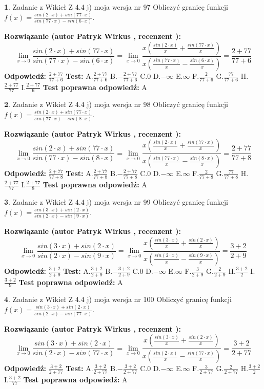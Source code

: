 \documentclass[12pt, a4paper]{article}
\theoremstyle{definition} %
\newtheorem{zad}{}
\newcommand{\zadStart}[1]{\begin{zad}#1\newline}
\newcommand{\zadStop}{\end{zad}}
\newcommand{\rozwStart}[2]{\noindent \textbf{Rozwiązanie (autor #1 , recenzent #2): }\newline}
\newcommand{\rozwStop}{\newline}
\newcommand{\odpStart}{\noindent \textbf{Odpowiedź:}\newline}
\newcommand{\odpStop}{\newline}
\newcommand{\testStart}{\noindent \textbf{Test:}\newline}
\newcommand{\testStop}{\newline}
\newcommand{\kluczStart}{\noindent \textbf{Test poprawna odpowiedź:}\newline}
\newcommand{\kluczStop}{\newline}
\begin{document}
\zadStart{Zadanie z Wikieł Z 4.4 j) moja wersja nr 97}
Obliczyć granicę funkcji $f(x)=\frac{sin(2\cdot x) +sin(77\cdot x)}{sin(77\cdot x) -sin(6\cdot x)}$.
\zadStop
\rozwStart{Patryk Wirkus}{}
$$\lim\limits_{x\to 0}\frac{sin(2\cdot x) +sin(77\cdot x)}{sin(77\cdot x) -sin(6\cdot x)}=\lim\limits_{x\to 0}\frac{x(\frac{sin(2\cdot x)}{x}+\frac{sin(77\cdot x)}{x})}{x(\frac{sin(77\cdot x)}{x}-\frac{sin(6\cdot x)}{x})}=\frac{2+77}{77+6}$$
\rozwStop
\odpStart
$\frac{2+77}{77+6}$
\odpStop
\testStart
A.$\frac{2+77}{77+6}$
B.$-\frac{2+77}{77+6}$
C.$0$
D.$-\infty$
E.$\infty$
F.$\frac{2}{77+6}$
G.$\frac{77}{77+6}$
H.$\frac{2+77}{77}$
I.$\frac{2+77}{6}$
\testStop
\kluczStart
A
\kluczStop



\zadStart{Zadanie z Wikieł Z 4.4 j) moja wersja nr 98}
Obliczyć granicę funkcji $f(x)=\frac{sin(2\cdot x) +sin(77\cdot x)}{sin(77\cdot x) -sin(8\cdot x)}$.
\zadStop
\rozwStart{Patryk Wirkus}{}
$$\lim\limits_{x\to 0}\frac{sin(2\cdot x) +sin(77\cdot x)}{sin(77\cdot x) -sin(8\cdot x)}=\lim\limits_{x\to 0}\frac{x(\frac{sin(2\cdot x)}{x}+\frac{sin(77\cdot x)}{x})}{x(\frac{sin(77\cdot x)}{x}-\frac{sin(8\cdot x)}{x})}=\frac{2+77}{77+8}$$
\rozwStop
\odpStart
$\frac{2+77}{77+8}$
\odpStop
\testStart
A.$\frac{2+77}{77+8}$
B.$-\frac{2+77}{77+8}$
C.$0$
D.$-\infty$
E.$\infty$
F.$\frac{2}{77+8}$
G.$\frac{77}{77+8}$
H.$\frac{2+77}{77}$
I.$\frac{2+77}{8}$
\testStop
\kluczStart
A
\kluczStop



\zadStart{Zadanie z Wikieł Z 4.4 j) moja wersja nr 99}
Obliczyć granicę funkcji $f(x)=\frac{sin(3\cdot x) +sin(2\cdot x)}{sin(2\cdot x) -sin(9\cdot x)}$.
\zadStop
\rozwStart{Patryk Wirkus}{}
$$\lim\limits_{x\to 0}\frac{sin(3\cdot x) +sin(2\cdot x)}{sin(2\cdot x) -sin(9\cdot x)}=\lim\limits_{x\to 0}\frac{x(\frac{sin(3\cdot x)}{x}+\frac{sin(2\cdot x)}{x})}{x(\frac{sin(2\cdot x)}{x}-\frac{sin(9\cdot x)}{x})}=\frac{3+2}{2+9}$$
\rozwStop
\odpStart
$\frac{3+2}{2+9}$
\odpStop
\testStart
A.$\frac{3+2}{2+9}$
B.$-\frac{3+2}{2+9}$
C.$0$
D.$-\infty$
E.$\infty$
F.$\frac{3}{2+9}$
G.$\frac{2}{2+9}$
H.$\frac{3+2}{2}$
I.$\frac{3+2}{9}$
\testStop
\kluczStart
A
\kluczStop



\zadStart{Zadanie z Wikieł Z 4.4 j) moja wersja nr 100}
Obliczyć granicę funkcji $f(x)=\frac{sin(3\cdot x) +sin(2\cdot x)}{sin(2\cdot x) -sin(77\cdot x)}$.
\zadStop
\rozwStart{Patryk Wirkus}{}
$$\lim\limits_{x\to 0}\frac{sin(3\cdot x) +sin(2\cdot x)}{sin(2\cdot x) -sin(77\cdot x)}=\lim\limits_{x\to 0}\frac{x(\frac{sin(3\cdot x)}{x}+\frac{sin(2\cdot x)}{x})}{x(\frac{sin(2\cdot x)}{x}-\frac{sin(77\cdot x)}{x})}=\frac{3+2}{2+77}$$
\rozwStop
\odpStart
$\frac{3+2}{2+77}$
\odpStop
\testStart
A.$\frac{3+2}{2+77}$
B.$-\frac{3+2}{2+77}$
C.$0$
D.$-\infty$
E.$\infty$
F.$\frac{3}{2+77}$
G.$\frac{2}{2+77}$
H.$\frac{3+2}{2}$
I.$\frac{3+2}{77}$
\testStop
\kluczStart
A
\kluczStop
\end{document}
